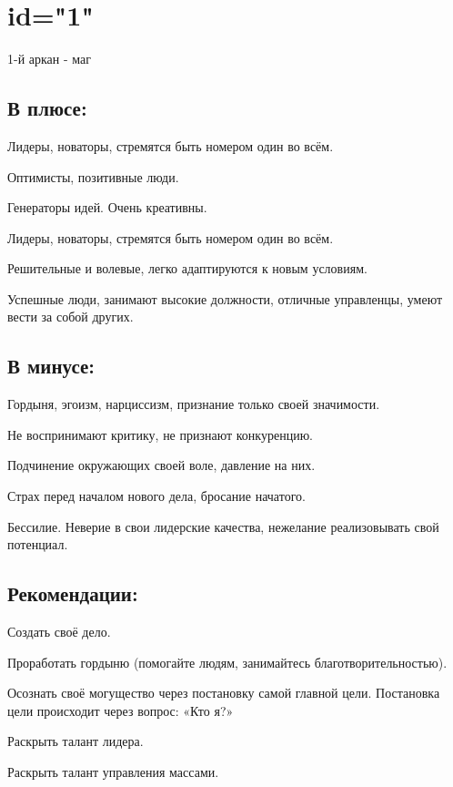 
\section{id="1"}{1-й аркан - маг}

\subsection{В плюсе:}
\item Лидеры, новаторы, стремятся быть номером один во всём. 
\item Оптимисты, позитивные люди.    
\item Генераторы идей. Очень креативны.
\item Лидеры, новаторы, стремятся быть номером один во всём. 
\item Решительные и волевые, легко адаптируются к новым условиям. 
\item Успешные люди, занимают высокие должности, отличные управленцы, умеют вести за собой других.
\endsubsection

\subsection{В минусе:}
\item Гордыня, эгоизм, нарциссизм, признание только своей значимости.                  
\item Не воспринимают критику, не признают конкуренцию.                                     
\item Подчинение окружающих своей воле, давление на них.                                   
\item Страх перед началом нового дела, бросание начатого.                                  
\item Бессилие. Неверие в свои лидерские качества, нежелание реализовывать свой потенциал. 
                                                                         
\endsubsection

\subsection{Рекомендации:}
\item Создать своё дело.                                                                                         
\item Проработать гордыню (помогайте людям, занимайтесь благотворительностью).                                    
\item Осознать своё могущество через постановку самой главной цели. Постановка цели происходит через вопрос: «Кто я?»
\item Раскрыть талант лидера.                                                                                     
\item Раскрыть талант управления массами.                                                                         
\endsubsection

